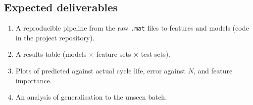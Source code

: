 \subsection{Expected deliverables}
\begin{enumerate}
  \item A reproducible pipeline from the raw \texttt{.mat} files to features
  and models (code in the project repository).
  \item A results table (models $\times$ feature sets $\times$ test sets).
  \item Plots of predicted against actual cycle life, error against $N$,
  and feature importance.
  \item An analysis of generalisation to the unseen batch.
\end{enumerate}
